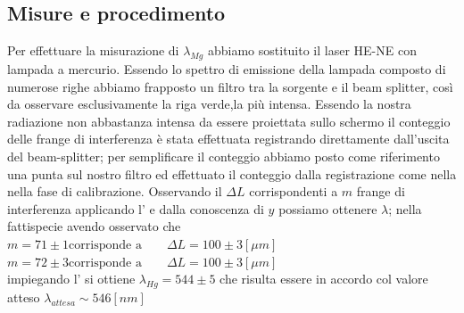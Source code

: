 \subsection{Misure e procedimento}
Per effettuare la misurazione di $\lambda_{Mg}$
abbiamo sostituito il laser HE-NE con 
lampada a mercurio.
Essendo lo spettro di emissione della lampada 
composto di numerose righe
abbiamo frapposto un filtro tra la sorgente e il beam splitter,
così da osservare esclusivamente la riga verde,la più intensa.
Essendo la nostra radiazione non abbastanza intensa da essere 
proiettata sullo schermo il conteggio delle frange di interferenza
è stata effettuata registrando direttamente dall'uscita del beam-splitter; 
per semplificare il conteggio abbiamo 
posto come riferimento una punta sul nostro filtro ed effettuato il conteggio 
dalla registrazione come nella nella fase di calibrazione.
Osservando il $\Delta L$ corrispondenti a $m$ frange di
interferenza applicando l' e dalla conoscenza di $y$ 
possiamo ottenere $\lambda$;
nella fattispecie avendo osservato che
\\
 $m=71 \pm 1\text{corrisponde a}\qquad \Delta L =100\pm 3 [\mu m]$
 \\
 $m=72 \pm 3\text{corrisponde a}\qquad \Delta L =100\pm 3 [\mu m]$
 \\
impiegando l' si ottiene $\lambda_{Hg}=544\pm 5$ che 
risulta essere in accordo col valore atteso 	
$\lambda_{attesa}\sim 546 [nm]$
